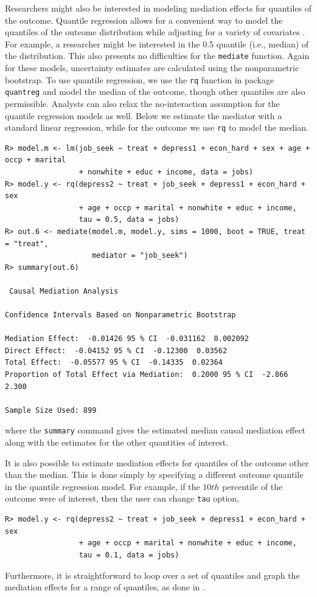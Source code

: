 \documentclass[11pt,letterpaper]{article}
\theoremstyle{plain}
\begin{document}
Researchers might also be interested in modeling mediation effects for
quantiles of the outcome.  Quantile regression allows for a convenient
way to model the quantiles of the outcome distribution while adjusting
for a variety of covariates \citep{Koenker:2005}.  For example, a
researcher might be interested in the 0.5 quantile (i.e., median)
of the distribution. This also presents no difficulties for the
\texttt{mediate} function.  Again for these models, uncertainty
estimates are calculated using the nonparametric bootstrap.  To use
quantile regression, we use the {\tt rq} function in package 
\texttt{quantreg} and model
the median of the outcome, though other quantiles are also
permissible.  Analysts can also relax the no-interaction assumption
for the quantile regression models as well.  Below we estimate the
mediator with a standard linear regression, while for the outcome we
use \texttt{rq} to model the median.
\begin{verbatim}
R> model.m <- lm(job_seek ~ treat + depress1 + econ_hard + sex + age + occp + marital
                 + nonwhite + educ + income, data = jobs)
R> model.y <- rq(depress2 ~ treat + job_seek + depress1 + econ_hard + sex
                 + age + occp + marital + nonwhite + educ + income, 
                 tau = 0.5, data = jobs)
R> out.6 <- mediate(model.m, model.y, sims = 1000, boot = TRUE, treat = "treat",
                    mediator = "job_seek")
R> summary(out.6)

 Causal Mediation Analysis 

Confidence Intervals Based on Nonparametric Bootstrap

Mediation Effect:  -0.01426 95 % CI  -0.031162  0.002092 
Direct Effect:  -0.04152 95 % CI  -0.12300  0.03562 
Total Effect:  -0.05577 95 % CI  -0.14335  0.02364 
Proportion of Total Effect via Mediation:  0.2000 95 % CI  -2.866  2.300 

Sample Size Used: 899 
\end{verbatim}
where the {\tt summary} command gives the estimated median causal
mediation effect along with the estimates for the other quantities of
interest.

It is also possible to estimate mediation effects for quantiles of the
outcome other than the median. This is done simply by specifying a
different outcome quantile in the quantile regression model. For
example, if the $10th$ percentile of the outcome were of interest,
then the user can change {\tt tau} option,
\begin{verbatim}
R> model.y <- rq(depress2 ~ treat + job_seek + depress1 + econ_hard + sex
                 + age + occp + marital + nonwhite + educ + income, 
                 tau = 0.1, data = jobs)
\end{verbatim}
Furthermore, it is straightforward to loop over a set of quantiles and
graph the mediation effects for a range of quantiles, as done in
\citet{imai:keel:ting:10}.
\end{document}
